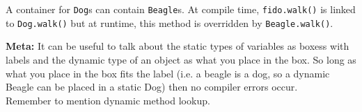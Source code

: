 \begin{blocksection}
\begin{parts}
\begin{solution}[0.7in]
A container for \lstinline$Dog$s can contain \lstinline$Beagle$s. At compile
time, \lstinline$fido.walk()$ is linked to \lstinline$Dog.walk()$ but at
runtime, this method is overridden by \lstinline$Beagle.walk()$.

\end{solution}
\end{parts}

\end{blocksection}
\begin{solution}[0.7in]
\textbf{Meta:} It can be useful to talk about the static types of variables as boxess
with labels and the dynamic type of an object as what you place in the box. So long as
what you place in the box fits the label (i.e. a beagle is a dog, so a dynamic Beagle can
be placed in a static Dog) then no compiler errors occur. \\
Remember to mention dynamic method lookup.
\end{solution}

